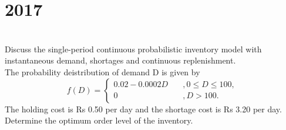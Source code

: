 \section*{2017}
\vspace{-.5cm}
\hrulefill \smallskip\\
 Discuss the single-period continuous probabilistic inventory model with instantaneous demand, shortages and continuous replenishment.\\The probability deistribution of demand D is given by
\[f(D) =  \begin{cases}
0.02 - 0.0002D \quad&, 0\leq D \leq 100, \\
0 &,D>100.
\end{cases} \] The holding cost is Rs 0.50 per day and the shortage cost is Rs 3.20 per day. Determine the optimum order level of the inventory.